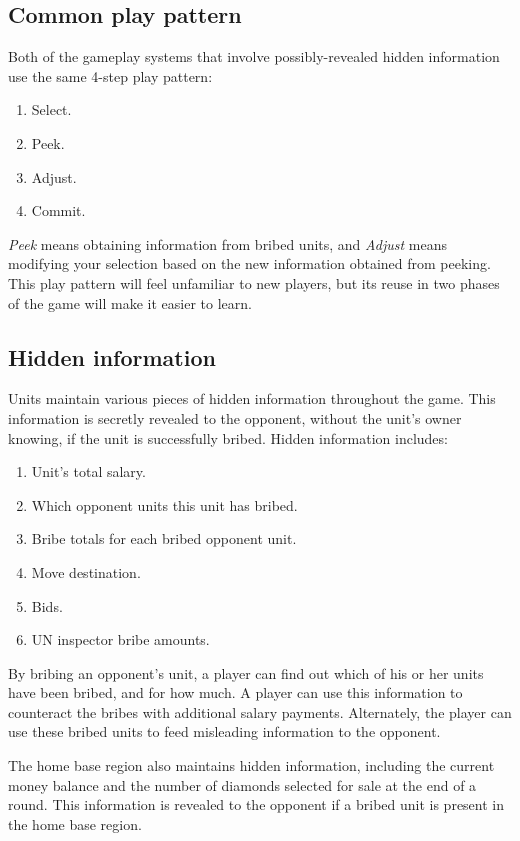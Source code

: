 \subsection{Common play pattern}
Both of the gameplay systems that involve possibly-revealed hidden information use the same 4-step play pattern:
\begin{enumerate}
\item Select.
\item Peek.
\item Adjust.
\item Commit.
\end{enumerate}
{\it Peek} means obtaining information from bribed units, and {\it Adjust} means modifying your selection based on the new information obtained from peeking.  This play pattern will feel unfamiliar to new players, but its reuse in two phases of the game will make it easier to learn.

\subsection{Hidden information}
Units maintain various pieces of hidden information throughout the game.  This information is secretly revealed to the opponent, without the unit's owner knowing, if the unit is successfully bribed.  Hidden information includes:
\begin{enumerate}
\item Unit's total salary.
\item Which opponent units this unit has bribed.
\item Bribe totals for each bribed opponent unit.
\item Move destination.
\item Bids.
\item UN inspector bribe amounts.
\end{enumerate}
By bribing an opponent's unit, a player can find out which of his or her units have been bribed, and for how much.  A player can use this information to counteract the bribes with additional salary payments.  Alternately, the player can use these bribed units to feed misleading information to the opponent.

The home base region also maintains hidden information, including the current money balance and the number of diamonds selected for sale at the end of a round.  This information is revealed to the opponent if a bribed unit is present in the home base region.



